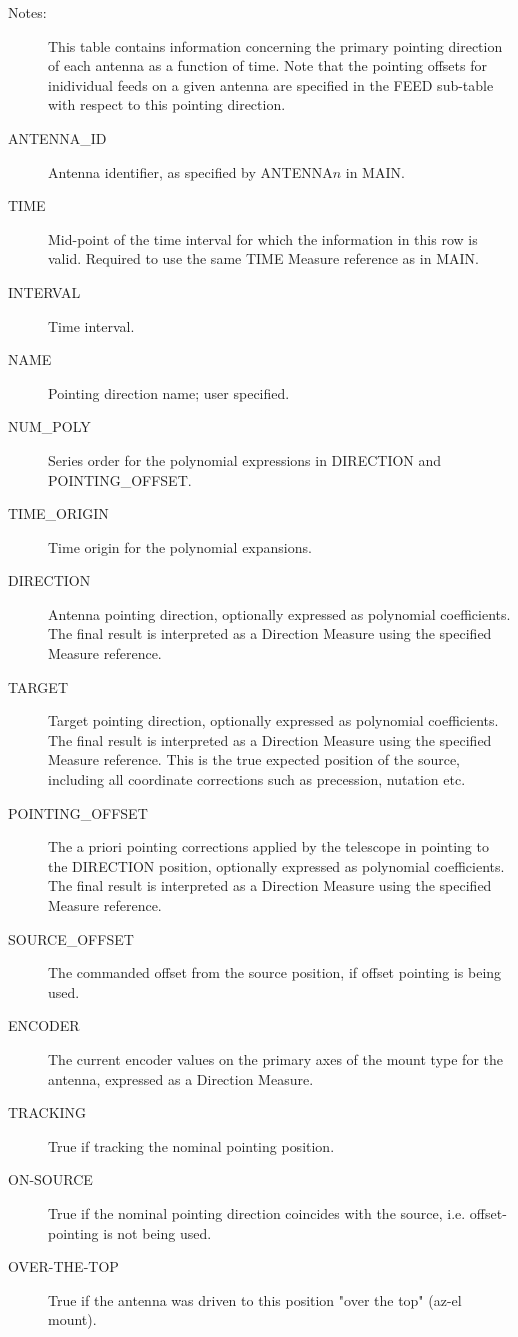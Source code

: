 \documentclass{article}
\begin{document}
\begin{description}

\item[Notes:] This table contains information concerning the primary
pointing direction of each antenna as a function of time. Note that
the pointing offsets for inidividual feeds on a given antenna are
specified in the FEED sub-table with respect to this pointing direction.

\item[ANTENNA\_ID] Antenna identifier, as specified by ANTENNA$n$ in MAIN.

\item[TIME] Mid-point of the time interval for which the information
in this row is valid. Required to use the same TIME Measure reference
as in MAIN.

\item[INTERVAL] Time interval.

\item[NAME] Pointing direction name; user specified.

\item[NUM\_POLY] Series order for the polynomial expressions in
DIRECTION and POINTING\_OFFSET.

\item[TIME\_ORIGIN] Time origin for the polynomial expansions.

\item[DIRECTION] Antenna pointing direction, optionally expressed as
polynomial coefficients. The final result is interpreted as a
Direction Measure using the specified Measure reference.

\item[TARGET] Target pointing direction, optionally expressed as
polynomial coefficients. The final result is interpreted as a
Direction Measure using the specified Measure reference. This is the
true expected position of the source, including all coordinate
corrections such as precession, nutation etc.

\item[POINTING\_OFFSET] The a priori pointing corrections applied by
the telescope in pointing to the DIRECTION position, optionally
expressed as polynomial coefficients. The final result is interpreted
as a Direction Measure using the specified Measure reference.

\item[SOURCE\_OFFSET] The commanded offset from the source position,
if offset pointing is being used.

\item[ENCODER] The current encoder values on the primary axes of the
mount type for the antenna, expressed as a Direction Measure.

\item[TRACKING] True if tracking the nominal pointing position.

\item[ON-SOURCE] True if the nominal pointing direction coincides with
the source, i.e. offset-pointing is not being used.

\item[OVER-THE-TOP] True if the antenna was driven to this position
"over the top" (az-el mount).
\end{description}
\end{document}
